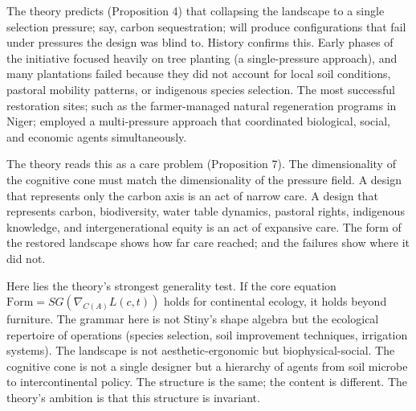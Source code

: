 The theory predicts (Proposition 4) that collapsing the landscape to a single selection pressure; say, carbon sequestration; will produce configurations that fail under pressures the design was blind to. History confirms this. Early phases of the initiative focused heavily on tree planting (a single-pressure approach), and many plantations failed because they did not account for local soil conditions, pastoral mobility patterns, or indigenous species selection. The most successful restoration sites; such as the farmer-managed natural regeneration programs in Niger; employed a multi-pressure approach that coordinated biological, social, and economic agents simultaneously.

The theory reads this as a care problem (Proposition 7). The dimensionality of the cognitive cone must match the dimensionality of the pressure field. A design that represents only the carbon axis is an act of narrow care. A design that represents carbon, biodiversity, water table dynamics, pastoral rights, indigenous knowledge, and intergenerational equity is an act of expansive care. The form of the restored landscape shows how far care reached; and the failures show where it did not.

Here lies the theory's strongest generality test. If the core equation $\mathrm{Form} = SG(\nabla_{C(A)} L(c,t))$ holds for continental ecology, it holds beyond furniture. The grammar here is not Stiny's shape algebra but the ecological repertoire of operations (species selection, soil improvement techniques, irrigation systems). The landscape is not aesthetic-ergonomic but biophysical-social. The cognitive cone is not a single designer but a hierarchy of agents from soil microbe to intercontinental policy. The structure is the same; the content is different. The theory's ambition is that this structure is invariant.
